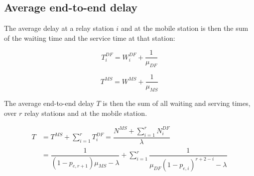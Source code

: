 \subsection{Average end-to-end delay}

The average delay at a relay station $i$ and at the mobile station is then the
sum of the waiting time and the service time at that station:

\begin{equation}
  T_i^{DF} = W_i^{DF} + \dfrac{1}{\mu_{DF}}
  \label{eq:02_10}
\end{equation}

\begin{equation}
  T^{MS} = W^{MS} + \dfrac{1}{\mu_{MS}}
  \label{eq:02_11}
\end{equation}


The average end-to-end delay $T$ is then the sum of all waiting and serving times,
over $r$ relay stations and at the mobile station.

\begin{align*}
  T &= T^{MS} + \sum\limits_{i=1}^r T_i^{DF}= \dfrac{N^{MS} + \sum\limits_{i=1}^r N_i^{DF}}{\lambda} \\
    &= \dfrac{1}{(1-p_{e,r+1})\mu_{MS} - \lambda} + \sum\limits_{i=1}^r \dfrac{1}{\mu_{DF} (1-p_{e,i})^{r+2-i} - \lambda}
\end{align*}
